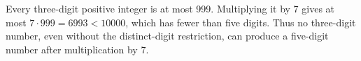 Every three-digit positive integer is at most 999. Multiplying it by 7 gives at most $7\cdot999=6993<10000$, which has fewer than five digits. Thus no three-digit number, even without the distinct-digit restriction, can produce a five-digit number after multiplication by 7.
